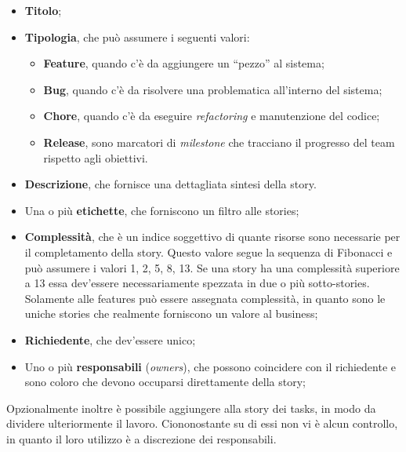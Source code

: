 \begin{itemize}

\item \textbf{Titolo};
\item \textbf{Tipologia}, che può assumere i seguenti valori:

	\begin{itemize}

	\item \textbf{Feature}, quando c'è da aggiungere un ``pezzo'' al sistema;
	\item \textbf{Bug}, quando c'è da risolvere una problematica all'interno del sistema;
	\item \textbf{Chore}, quando c'è da eseguire \textit{refactoring} e manutenzione del codice;
	\item \textbf{Release}, sono marcatori di \textit{milestone} che tracciano il progresso del team rispetto agli obiettivi.

	\end{itemize}

\item \textbf{Descrizione}, che fornisce una dettagliata sintesi della story.
\item Una o più \textbf{etichette}, che forniscono un filtro alle stories;
\item \textbf{Complessità}, che è un indice soggettivo di quante risorse sono necessarie per il completamento della story. Questo valore segue la sequenza di Fibonacci e può assumere i valori 1, 2, 5, 8, 13. Se una story ha una complessità superiore a 13 essa dev'essere necessariamente spezzata in due o più sotto-stories. Solamente alle features può essere assegnata complessità, in quanto sono le uniche stories che realmente forniscono un valore al business;
\item \textbf{Richiedente}, che dev'essere unico;
\item Uno o più \textbf{responsabili} (\textit{owners}), che possono coincidere con il richiedente e sono coloro che devono occuparsi direttamente della story;

\end{itemize}

Opzionalmente inoltre è possibile aggiungere alla story dei tasks, in modo da dividere ulteriormente il lavoro. Ciononostante su di essi non vi è alcun controllo, in quanto il loro utilizzo è a discrezione dei responsabili.

